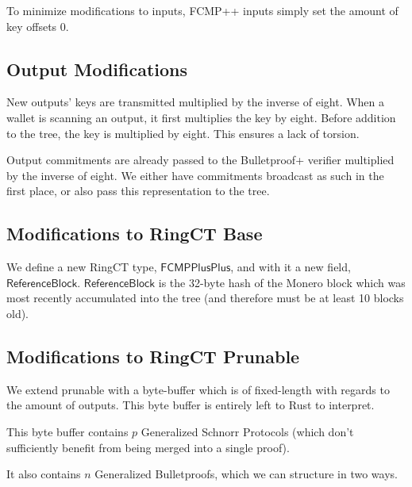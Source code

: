 \documentclass[]{article}
\begin{document}
To minimize modifications to inputs, FCMP++ inputs simply set the amount of key offsets 0.

\subsection{Output Modifications}

New outputs' keys are transmitted multiplied by the inverse of eight. When a wallet is scanning an output, it first multiplies the key by eight. Before addition to the tree, the key is multiplied by eight. This ensures a lack of torsion.

Output commitments are already passed to the Bulletproof+ verifier multiplied by the inverse of eight. We either have commitments broadcast as such in the first place, or also pass this representation to the tree.

\subsection{Modifications to RingCT Base}

We define a new RingCT type, $\mathsf{FCMPPlusPlus}$, and with it a new field, $\mathsf{ReferenceBlock}$. $\mathsf{ReferenceBlock}$ is the 32-byte hash of the Monero block which was most recently accumulated into the tree (and therefore must be at least 10 blocks old).

\subsection{Modifications to RingCT Prunable}

We extend prunable with a byte-buffer which is of fixed-length with regards to the amount of outputs. This byte buffer is entirely left to Rust to interpret.

This byte buffer contains $p$ Generalized Schnorr Protocols (which don't sufficiently benefit from being merged into a single proof).

It also contains $n$ Generalized Bulletproofs, which we can structure in two ways.
\end{document}
